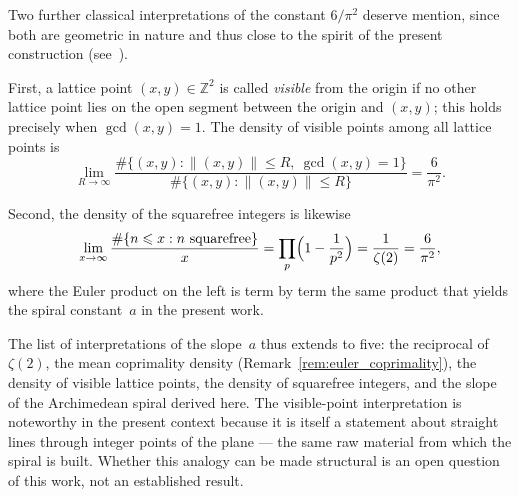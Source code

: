 \begin{remark}
\label{rem:visible_squarefree}
Two further classical interpretations of the constant $6/\pi^2$ deserve
mention, since both are geometric in nature and thus close to the spirit
of the present construction (see~\cite{Hardy2008}).

First, a lattice point $(x,y) \in \mathbb{Z}^2$ is called \emph{visible}
from the origin if no other lattice point lies on the open segment
between the origin and $(x,y)$; this holds precisely when
$\gcd(x,y)=1$. The density of visible points among all lattice points is
\begin{equation}
  \lim_{R \to \infty}
  \frac{\#\{(x,y) : \|(x,y)\| \leqslant R,\ \gcd(x,y)=1\}}
       {\#\{(x,y) : \|(x,y)\| \leqslant R\}}
  = \frac{6}{\pi^2}.
\end{equation}

Second, the density of the squarefree integers is likewise
\begin{equation}
  \lim_{x \to \infty} \frac{\#\{n \leqslant x : n \text{ squarefree}\}}{x}
  = \prod_{p} \Bigl(1 - \frac{1}{p^2}\Bigr)
  = \frac{1}{\zeta(2)} = \frac{6}{\pi^2},
\end{equation}
where the Euler product on the left is term by term the same product
that yields the spiral constant~$a$ in the present work.

The list of interpretations of the slope~$a$ thus extends to five: the
reciprocal of $\zeta(2)$, the mean coprimality density
(Remark~\ref{rem:euler_coprimality}), the density of visible lattice
points, the density of squarefree integers, and the slope of the
Archimedean spiral derived here. The visible-point interpretation is
noteworthy in the present context because it is itself a statement about
straight lines through integer points of the plane --- the same
raw material from which the spiral is built. Whether this analogy can be
made structural is an open question of this work, not an established
result.
\end{remark}

